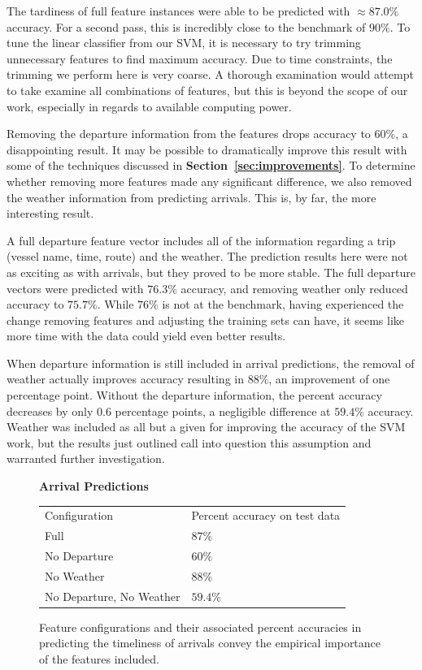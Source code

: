 \documentclass[11pt]{article} %
\begin{document}
The tardiness of full feature instances were able to be predicted with 
$\approx 87.0\%$ accuracy. For a second pass, this is incredibly close to the 
benchmark of $90\%$. To tune the linear classifier from our SVM, it is necessary
to try trimming unnecessary features to find maximum accuracy. Due to time 
constraints, the trimming we perform here is very coarse. A thorough examination
would attempt to take examine all combinations of features, but this is beyond the
scope of our work, especially in regards to available computing power.

Removing the departure information from the features drops accuracy to $60\%$, 
a disappointing result. It may be possible to dramatically improve this result with
some of the techniques discussed in \textbf{Section~\ref{sec:improvements}}. 
To determine whether removing more features made any significant difference, we
also removed the weather information from predicting arrivals.  This is, by far,
the more interesting result.

A full departure feature vector includes all of the information regarding a trip
(vessel name, time, route) and the weather. The prediction results here were not
as exciting as with arrivals, but they proved to be more stable. The full 
departure vectors were predicted with $76.3\%$ accuracy, and removing weather
only reduced accuracy to $75.7\%$. While $76\%$ is not at the benchmark, having
experienced the change removing features and adjusting the training sets can have,
it seems like more time with the data could yield even better results.

When departure information is still included in arrival predictions, the removal of 
weather actually improves accuracy resulting in $88\%$, an improvement of one
percentage point. Without the departure information, the percent accuracy decreases
by only $0.6$ percentage points, a negligible difference at $59.4\%$ accuracy. 
Weather was included as all but a given for improving the accuracy of the SVM
work, but the results just outlined call into question this assumption and warranted 
further investigation.

\begin{figure}
    \centering
    \textbf{Arrival Predictions}

    \begin{tabular}{ll}
        Configuration & Percent accuracy on test data\\
        Full          & $87\%$\\
        No Departure  & $60\%$\\
        No Weather    & $88\%$\\
        No Departure, No Weather  & $59.4\%$\\
    \end{tabular}
    \caption{Feature configurations and their associated percent accuracies in
         predicting the timeliness of arrivals convey the empirical importance of 
         the features included.}
    \label{fig:second_run_data_arrivals}
\end{figure}
\end{document}
